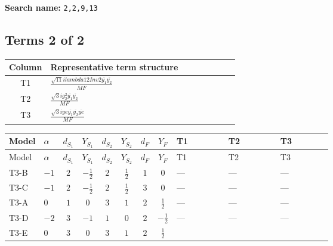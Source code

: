 \documentclass[8pt]{article}
\begin{document}
\begin{landscape}
\begin{longtable}{@{}llcccccc >{\raggedright\arraybackslash}p{0.21\linewidth} >{\raggedright\arraybackslash}p{0.21\linewidth} >{\raggedright\arraybackslash}p{0.21\linewidth}@{}}
\midrule
\bottomrule
\end{longtable}
\clearpage
\noindent\textbf{Search name: }\texttt{2,2,9,13}\par\smallskip
\subsection*{Terms 2 of 2}
\begin{center}
\begin{tabular}{@{}c >{\raggedright\arraybackslash}p{0.82\linewidth}@{}}
\toprule
Column & Representative term structure \\
\midrule
T1 & \(\displaystyle \frac{\sqrt{11} i lambda12Inv2 \overline{y_{1}} \overline{y_{2}}}{MF}\) \\
\midrule
T2 & \(\displaystyle \frac{\sqrt{3} i g_{2}^{2} \overline{y_{1}} \overline{y_{2}}}{MF}\) \\
\midrule
T3 & \(\displaystyle \frac{\sqrt{3} i ye \overline{y_{1}} \overline{y_{2}} \overline{ye}}{MF}\) \\
\midrule
\bottomrule
\end{tabular}
\end{center}
\smallskip
\tiny
\begin{longtable}{@{}llcccccc >{\raggedright\arraybackslash}p{0.21\linewidth} >{\raggedright\arraybackslash}p{0.21\linewidth} >{\raggedright\arraybackslash}p{0.21\linewidth}@{}}
\toprule
Model & $\alpha$ & $d_{S_1}$ & $Y_{S_1}$ & $d_{S_2}$ & $Y_{S_2}$ & $d_F$ & $Y_F$ & T1 & T2 & T3 \\
\midrule
\endfirsthead
\toprule
Model & $\alpha$ & $d_{S_1}$ & $Y_{S_1}$ & $d_{S_2}$ & $Y_{S_2}$ & $d_F$ & $Y_F$ & T1 & T2 & T3 \\
\midrule
\endhead
T3-B & $-1$ & $2$ & $-\frac{1}{2}$ & $2$ & $\frac{1}{2}$ & $1$ & $0$ & --- & --- & --- \\
\midrule
T3-C & $-1$ & $2$ & $-\frac{1}{2}$ & $2$ & $\frac{1}{2}$ & $3$ & $0$ & --- & --- & --- \\
\midrule
T3-A & $0$ & $1$ & $0$ & $3$ & $1$ & $2$ & $\frac{1}{2}$ & --- & --- & --- \\
\midrule
T3-D & $-2$ & $3$ & $-1$ & $1$ & $0$ & $2$ & $-\frac{1}{2}$ & --- & --- & --- \\
\midrule
T3-E & $0$ & $3$ & $0$ & $3$ & $1$ & $2$ & $\frac{1}{2}$ & \scriptsize\adjustbox{max width=\linewidth}{$\begin{gathered} \frac{3 \sqrt{11} i lambda12Inv2 \overline{y_{1}} \overline{y_{2}}}{22 MF}\end{gathered}$} & \scriptsize\adjustbox{max width=\linewidth}{$\begin{gathered} \frac{11 \sqrt{3} i g_{2}^{2} \overline{y_{1}} \overline{y_{2}}}{8 MF}\end{gathered}$} & \scriptsize\adjustbox{max width=\linewidth}{$\begin{gathered} - \frac{\sqrt{3} i ye \overline{y_{1}} \overline{y_{2}} \overline{ye}}{12 MF}\end{gathered}$} \\

\end{longtable}
\end{landscape}
\end{document}
